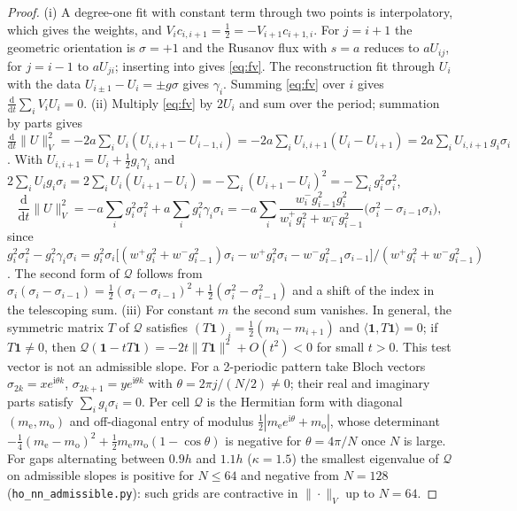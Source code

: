 \documentclass[11pt,a4paper]{article}
\theoremstyle{plain}
\theoremstyle{definition}
\theoremstyle{remark}
\numberwithin{equation}{section}
\newcommand{\dd}{\mathrm{d}}
\newcommand{\ii}{\mathrm{i}}
\newcommand{\A}[1]{\cite[#1]{Addendum}}
\begin{document}
\begin{proof}
(i) A degree-one fit with constant term through two points is interpolatory, which gives the weights, and $V_ic_{i,i+1}=\tfrac12=-V_{i+1}c_{i+1,i}$. For $j=i+1$ the geometric orientation is $\sigma=+1$ and the Rusanov flux \A{(4.3)} with $s=a$ reduces to $aU_{ij}$, for $j=i-1$ to $aU_{ji}$; inserting into \A{(4.4)} gives \eqref{eq:fv}. The reconstruction fit through $U_i$ with the data $U_{i\pm1}-U_i=\pm g\sigma$ gives $\gamma_i$. Summing \eqref{eq:fv} over $i$ gives $\frac{\dd}{\dd t}\sum_iV_iU_i=0$.
(ii) Multiply \eqref{eq:fv} by $2U_i$ and sum over the period; summation by parts gives $\frac{\dd}{\dd t}\|U\|_V^2=-2a\sum_iU_i(U_{i,i+1}-U_{i-1,i})=-2a\sum_iU_{i,i+1}(U_i-U_{i+1})=2a\sum_iU_{i,i+1}\,g_i\sigma_i$. With $U_{i,i+1}=U_i+\tfrac12g_i\gamma_i$ and $2\sum_iU_ig_i\sigma_i=2\sum_iU_i(U_{i+1}-U_i)=-\sum_i(U_{i+1}-U_i)^2=-\sum_ig_i^2\sigma_i^2$,
\[
\frac{\dd}{\dd t}\|U\|_V^2=-a\sum_i g_i^2\sigma_i^2+a\sum_ig_i^2\gamma_i\sigma_i
=-a\sum_i\frac{w^-_ig_{i-1}^2g_i^2}{w^+_ig_i^2+w^-_ig_{i-1}^2}\big(\sigma_i^2-\sigma_{i-1}\sigma_i\big),
\]
since $g_i^2\sigma_i^2-g_i^2\gamma_i\sigma_i=g_i^2\sigma_i\big[(w^+g_i^2+w^-g_{i-1}^2)\sigma_i-w^+g_i^2\sigma_i-w^-g_{i-1}^2\sigma_{i-1}\big]/(w^+g_i^2+w^-g_{i-1}^2)$. The second form of $\mathcal Q$ follows from $\sigma_i(\sigma_i-\sigma_{i-1})=\tfrac12(\sigma_i-\sigma_{i-1})^2+\tfrac12(\sigma_i^2-\sigma_{i-1}^2)$ and a shift of the index in the telescoping sum.
(iii) For constant $m$ the second sum vanishes. In general, the symmetric matrix $T$ of $\mathcal Q$ satisfies $(T\mathbf 1)_i=\tfrac12(m_i-m_{i+1})$ and $\langle\mathbf 1,T\mathbf 1\rangle=0$; if $T\mathbf 1\ne0$, then $\mathcal Q(\mathbf 1-tT\mathbf 1)=-2t\|T\mathbf 1\|^2+O(t^2)<0$ for small $t>0$. This test vector is not an admissible slope. For a 2-periodic pattern take Bloch vectors $\sigma_{2k}=xe^{\ii\theta k}$, $\sigma_{2k+1}=ye^{\ii\theta k}$ with $\theta=2\pi j/(N/2)\ne0$; their real and imaginary parts satisfy $\sum_ig_i\sigma_i=0$. Per cell $\mathcal Q$ is the Hermitian form with diagonal $(m_{\mathrm e},m_{\mathrm o})$ and off-diagonal entry of modulus $\frac12|m_{\mathrm e}e^{\ii\theta}+m_{\mathrm o}|$, whose determinant $-\frac14(m_{\mathrm e}-m_{\mathrm o})^2+\frac12m_{\mathrm e}m_{\mathrm o}(1-\cos\theta)$ is negative for $\theta=4\pi/N$ once $N$ is large. For gaps alternating between $0.9h$ and $1.1h$ ($\kappa=1.5$) the smallest eigenvalue of $\mathcal Q$ on admissible slopes is positive for $N\le64$ and negative from $N=128$ (\texttt{ho\_nn\_admissible.py}): such grids are contractive in $\|\cdot\|_V$ up to $N=64$.
\end{proof}
\end{document}
